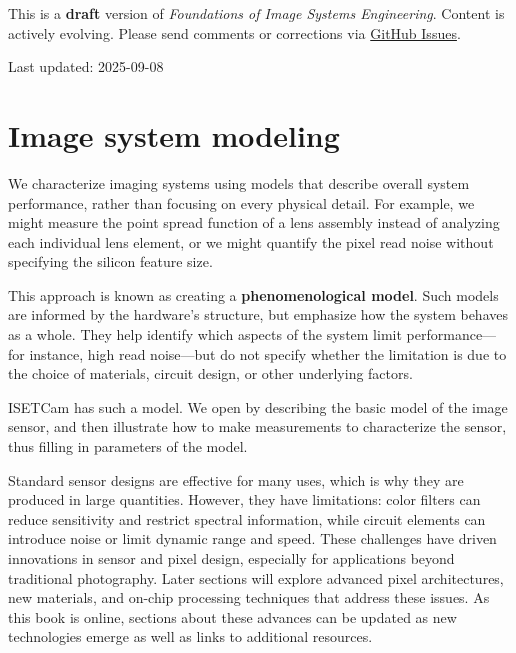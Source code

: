 \documentclass[
  letterpaper,
]{book}
\begin{document}
\begin{tcolorbox}[enhanced jigsaw, opacityback=0, breakable, coltitle=black, leftrule=.75mm, left=2mm, colframe=quarto-callout-warning-color-frame, opacitybacktitle=0.6, bottomtitle=1mm, bottomrule=.15mm, toprule=.15mm, title=\textcolor{quarto-callout-warning-color}{\faExclamationTriangle}\hspace{0.5em}{Work in Progress}, titlerule=0mm, toptitle=1mm, colback=white, rightrule=.15mm, colbacktitle=quarto-callout-warning-color!10!white, arc=.35mm]

This is a \textbf{draft} version of \emph{Foundations of Image Systems
Engineering}. Content is actively evolving. Please send comments or
corrections via \href{https://github.com/wandell/FISE-git/issues}{GitHub
Issues}.

Last updated: 2025-09-08

\end{tcolorbox}

\section{Image system modeling}\label{sensor-system-modeling-overview}

We characterize imaging systems using models that describe overall
system performance, rather than focusing on every physical detail. For
example, we might measure the point spread function of a lens assembly
instead of analyzing each individual lens element, or we might quantify
the pixel read noise without specifying the silicon feature size.

This approach is known as creating a \textbf{phenomenological model}.
Such models are informed by the hardware's structure, but emphasize how
the system behaves as a whole. They help identify which aspects of the
system limit performance---for instance, high read noise---but do not
specify whether the limitation is due to the choice of materials,
circuit design, or other underlying factors.

ISETCam has such a model. We open by describing the basic model of the
image sensor, and then illustrate how to make measurements to
characterize the sensor, thus filling in parameters of the model.

Standard sensor designs are effective for many uses, which is why they
are produced in large quantities. However, they have limitations: color
filters can reduce sensitivity and restrict spectral information, while
circuit elements can introduce noise or limit dynamic range and speed.
These challenges have driven innovations in sensor and pixel design,
especially for applications beyond traditional photography. Later
sections will explore advanced pixel architectures, new materials, and
on-chip processing techniques that address these issues. As this book is
online, sections about these advances can be updated as new technologies
emerge as well as links to additional resources.
\end{document}
